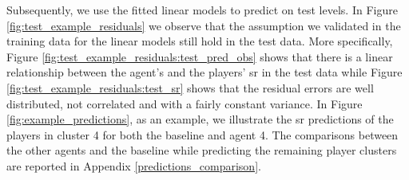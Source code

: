 Subsequently, we use the fitted linear models to predict on test levels.
In Figure \ref{fig:test_example_residuals} we observe that the assumption we validated in the training data for the linear models still hold in the test data. More specifically, Figure \ref{fig:test_example_residuals:test_pred_obs} shows that there is a linear relationship between the agent's and the players' \acs{sr} in the test data while Figure \ref{fig:test_example_residuals:test_sr} shows that the residual errors are well distributed, not correlated and with a fairly constant variance.
In Figure \ref{fig:example_predictions}, as an example, we illustrate the \acs{sr} predictions of the players in cluster 4 for both the baseline and agent 4. The comparisons between the other agents and the baseline while predicting the remaining player clusters are reported in Appendix \ref{predictions_comparison}.
